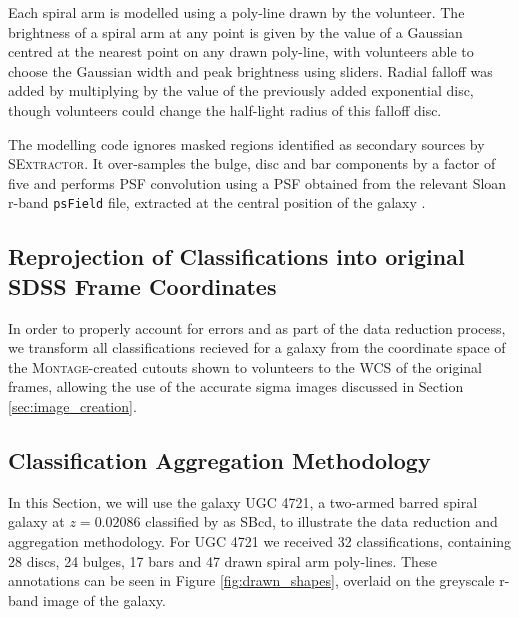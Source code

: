 \documentclass[../main.tex]{subfiles}
\begin{document}
Each spiral arm is modelled using a poly-line drawn by the volunteer. The brightness of a spiral arm at any point is given by the value of a Gaussian centred at the nearest point on any drawn poly-line, with volunteers able to choose the Gaussian width and peak brightness using sliders. Radial falloff was added by multiplying by the value of the previously added exponential disc, though volunteers could change the half-light radius of this falloff disc.

The modelling code ignores masked regions identified as secondary sources by \textsc{SExtractor}. It over-samples the bulge, disc and bar components by a factor of five and performs PSF convolution using a PSF obtained from the relevant Sloan r-band \texttt{psField} file, extracted at the central position of the galaxy \citep{2002AJ....123..485S}.


\subsection{Reprojection of Classifications into original SDSS Frame Coordinates}

In order to properly account for errors and as part of the data reduction process, we transform all classifications recieved for a galaxy from the coordinate space of the \textsc{Montage}-created cutouts shown to volunteers to the WCS of the original frames, allowing the use of the accurate sigma images discussed in Section \ref{sec:image_creation}.


\subsection{Classification Aggregation Methodology}

In this Section, we will use the galaxy UGC 4721, a two-armed barred spiral galaxy at $z=0.02086$ classified by \citet{deVaucouleurs1991} as SBcd, to illustrate the data reduction and aggregation methodology. For UGC 4721 we received 32 classifications, containing 28 discs, 24 bulges, 17 bars and 47 drawn spiral arm poly-lines. These annotations can be seen in Figure \ref{fig:drawn_shapes}, overlaid on the greyscale r-band image of the galaxy.

\begin{figure*}
  \caption{Components drawn by volunteers for UGC 4721. The top left panel shows drawn discs, top right shows drawn bulges, bottom left shows drawn bars and bottom right shows drawn spiral arms. Discs, bulges and bars are displayed at twice their effective radii.}
  \label{fig:drawn_shapes}
\end{figure*}
\end{document}
